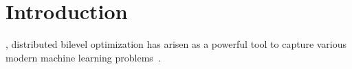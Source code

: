 \documentclass[lettersize,journal]{IEEEtran}
\begin{document}
\section{Introduction}
, distributed bilevel optimization has arisen as a powerful tool to capture various modern machine learning problems~\cite{gao2023convergence, HeHHLWY24compress}.
\end{document}

